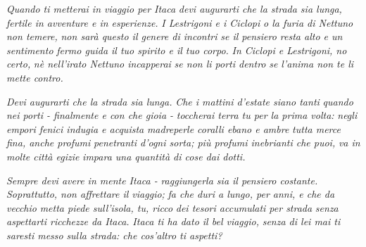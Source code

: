 \begin{dedication}
\small
    \textit{Quando ti metterai in viaggio per Itaca}\newline
\textit{devi augurarti che la strada sia lunga,}\newline
\textit{fertile in avventure e in esperienze.}\newline
\textit{I Lestrigoni e i Ciclopi}\newline
\textit{o la furia di Nettuno non temere,}\newline
\textit{non sarà questo il genere di incontri}\newline
\textit{se il pensiero resta alto e un sentimento}\newline
\textit{fermo guida il tuo spirito e il tuo corpo.}\newline
\textit{In Ciclopi e Lestrigoni, no certo,}\newline
\textit{nè nell’irato Nettuno incapperai}\newline
\textit{se non li porti dentro}\newline
\textit{se l’anima non te li mette contro.}\newline

\textit{Devi augurarti che la strada sia lunga.}\newline
\textit{Che i mattini d’estate siano tanti}\newline
\textit{quando nei porti - finalmente e con che gioia -}\newline
\textit{toccherai terra tu per la prima volta:}\newline
\textit{negli empori fenici indugia e acquista}\newline
\textit{madreperle coralli ebano e ambre}\newline
\textit{tutta merce fina, anche profumi}\newline
\textit{penetranti d’ogni sorta; più profumi inebrianti che puoi,}\newline
\textit{va in molte città egizie}\newline
\textit{impara una quantità di cose dai dotti.}\newline

\textit{Sempre devi avere in mente Itaca -}\newline
\textit{raggiungerla sia il pensiero costante.}\newline
\textit{Soprattutto, non affrettare il viaggio;}\newline
\textit{fa che duri a lungo, per anni, e che da vecchio}\newline
\textit{metta piede sull’isola, tu, ricco}\newline
\textit{dei tesori accumulati per strada}\newline
\textit{senza aspettarti ricchezze da Itaca.}\newline
\textit{Itaca ti ha dato il bel viaggio,}\newline
\textit{senza di lei mai ti saresti messo}\newline
\textit{sulla strada: che cos’altro ti aspetti?}\newline


\end{dedication}
